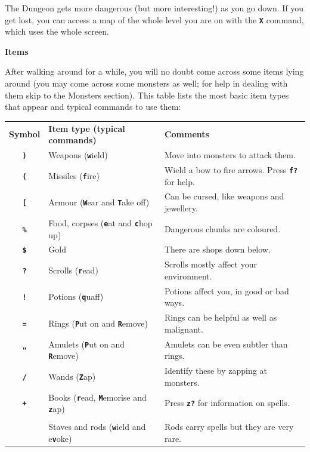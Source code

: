 \documentclass[a4paper,10pt]{article}
\newcommand{\key}[1]{{{\texttt{\textbf{#1}}}}} %
\newcommand{\sex}[1]{{{\textbf{#1}}}} %
\newcommand{\para}{\vspace{1.5ex}}
\begin{document}
The Dungeon gets more dangerous (but more interesting!) as you go down. If you 
get lost, you can access a map of the whole level you are on with the \key{X} 
command, which uses the whole screen. 

\para\para

\sex{Items} \para 

After walking around for a while, you will no doubt come across some items 
lying around (you may come across some monsters as well; for help in dealing 
with them skip to the Monsters section). This table lists the most basic item
types that appear and typical commands to use them:

\para

\begin{tabular}{cll}
\sex{Symbol} & \sex{Item type (typical commands)} & \sex{Comments} \\
\key{)}  & Weapons (\key{w}ield)                  & Move into monsters to attack them.\\
\key{(}  & Missiles (\key{f}ire)                  & Wield a bow to fire arrows. Press \key{f?} for help.\\ 
\key{[}  & Armour (\key{W}ear and \key{T}ake off) & Can be cursed, like weapons and jewellery. \\
\key{\%} & Food, corpses (\key{e}at and \key{c}hop up) & Dangerous chunks are coloured. \\
\key{\$} & Gold                                   & There are shops down below. \\
\key{?}  & Scrolls (\key{r}ead)                   & Scrolls mostly affect your environment.\\
\key{!}  & Potions (\key{q}uaff)                  & Potions affect you, in good or bad ways. \\
\key{=}  & Rings (\key{P}ut on and \key{R}emove)  & Rings can be helpful as well as malignant. \\
\key{"}  & Amulets (\key{P}ut on and \key{R}emove) & Amulets can be even subtler than rings. \\
\key{/}  & Wands (\key{Z}ap)                      & Identify these by zapping at monsters. \\
\key{+}  & Books (\key{r}ead, \key{M}emorise and \key{z}ap) & Press \key{z?} for information on spells.\\
\key{\char`\\} & Staves and rods (\key{w}ield and e\key{v}oke) \hspace{0.2em}
                                                  & Rods carry spells but they are very rare.
\end{tabular}
\end{document}
